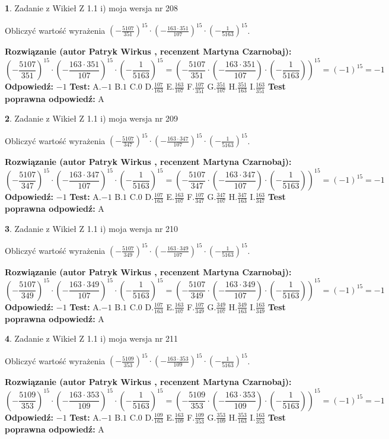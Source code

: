 \documentclass[12pt, a4paper]{article}
\theoremstyle{definition} %
\newtheorem{zad}{}
\newcommand{\zadStart}[1]{\begin{zad}#1\newline}
\newcommand{\zadStop}{\end{zad}}
\newcommand{\rozwStart}[2]{\noindent \textbf{Rozwiązanie (autor #1 , recenzent #2): }\newline}
\newcommand{\rozwStop}{\newline}
\newcommand{\odpStart}{\noindent \textbf{Odpowiedź:}\newline}
\newcommand{\odpStop}{\newline}
\newcommand{\testStart}{\noindent \textbf{Test:}\newline}
\newcommand{\testStop}{\newline}
\newcommand{\kluczStart}{\noindent \textbf{Test poprawna odpowiedź:}\newline}
\newcommand{\kluczStop}{\newline}
\begin{document}
\zadStart{Zadanie z Wikieł Z 1.1 i) moja wersja nr 208}

Obliczyć wartość wyrażenia $(-\frac{5107}{351})^{15} \cdot (-\frac{163 \cdot 351}{107})^{15} \cdot (-\frac{1}{5163})^{15}$.
\zadStop
\rozwStart{Patryk Wirkus}{Martyna Czarnobaj}
$$(-\frac{5107}{351})^{15} \cdot (-\frac{163 \cdot 351}{107})^{15} \cdot (-\frac{1}{5163})^{15} = (-\frac{5107}{351} \cdot (-\frac{163 \cdot 351}{107}) \cdot (-\frac{1}{5163}))^{15} = (-1)^{15} = -1$$
\rozwStop
\odpStart
$-1$
\odpStop
\testStart
A.$-1$ B.$1$ C.$0$ D.$\frac{107}{163}$ E.$\frac{163}{107}$
F.$\frac{107}{351}$ G.$\frac{351}{107}$
H.$\frac{351}{163}$
I.$\frac{163}{351}$
\testStop
\kluczStart
A
\kluczStop



\zadStart{Zadanie z Wikieł Z 1.1 i) moja wersja nr 209}

Obliczyć wartość wyrażenia $(-\frac{5107}{347})^{15} \cdot (-\frac{163 \cdot 347}{107})^{15} \cdot (-\frac{1}{5163})^{15}$.
\zadStop
\rozwStart{Patryk Wirkus}{Martyna Czarnobaj}
$$(-\frac{5107}{347})^{15} \cdot (-\frac{163 \cdot 347}{107})^{15} \cdot (-\frac{1}{5163})^{15} = (-\frac{5107}{347} \cdot (-\frac{163 \cdot 347}{107}) \cdot (-\frac{1}{5163}))^{15} = (-1)^{15} = -1$$
\rozwStop
\odpStart
$-1$
\odpStop
\testStart
A.$-1$ B.$1$ C.$0$ D.$\frac{107}{163}$ E.$\frac{163}{107}$
F.$\frac{107}{347}$ G.$\frac{347}{107}$
H.$\frac{347}{163}$
I.$\frac{163}{347}$
\testStop
\kluczStart
A
\kluczStop



\zadStart{Zadanie z Wikieł Z 1.1 i) moja wersja nr 210}

Obliczyć wartość wyrażenia $(-\frac{5107}{349})^{15} \cdot (-\frac{163 \cdot 349}{107})^{15} \cdot (-\frac{1}{5163})^{15}$.
\zadStop
\rozwStart{Patryk Wirkus}{Martyna Czarnobaj}
$$(-\frac{5107}{349})^{15} \cdot (-\frac{163 \cdot 349}{107})^{15} \cdot (-\frac{1}{5163})^{15} = (-\frac{5107}{349} \cdot (-\frac{163 \cdot 349}{107}) \cdot (-\frac{1}{5163}))^{15} = (-1)^{15} = -1$$
\rozwStop
\odpStart
$-1$
\odpStop
\testStart
A.$-1$ B.$1$ C.$0$ D.$\frac{107}{163}$ E.$\frac{163}{107}$
F.$\frac{107}{349}$ G.$\frac{349}{107}$
H.$\frac{349}{163}$
I.$\frac{163}{349}$
\testStop
\kluczStart
A
\kluczStop



\zadStart{Zadanie z Wikieł Z 1.1 i) moja wersja nr 211}

Obliczyć wartość wyrażenia $(-\frac{5109}{353})^{15} \cdot (-\frac{163 \cdot 353}{109})^{15} \cdot (-\frac{1}{5163})^{15}$.
\zadStop
\rozwStart{Patryk Wirkus}{Martyna Czarnobaj}
$$(-\frac{5109}{353})^{15} \cdot (-\frac{163 \cdot 353}{109})^{15} \cdot (-\frac{1}{5163})^{15} = (-\frac{5109}{353} \cdot (-\frac{163 \cdot 353}{109}) \cdot (-\frac{1}{5163}))^{15} = (-1)^{15} = -1$$
\rozwStop
\odpStart
$-1$
\odpStop
\testStart
A.$-1$ B.$1$ C.$0$ D.$\frac{109}{163}$ E.$\frac{163}{109}$
F.$\frac{109}{353}$ G.$\frac{353}{109}$
H.$\frac{353}{163}$
I.$\frac{163}{353}$
\testStop
\kluczStart
A
\kluczStop
\end{document}

